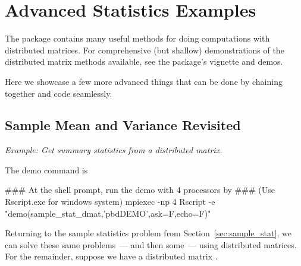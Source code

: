
\chapter{Advanced Statistics Examples}
\label{chpt:avdstat}

\vspace{0.5cm}


The  package contains many useful methods for doing computations
with distributed matrices. For comprehensive (but shallow) demonstrations of
the distributed matrix methods available, see the  package's
vignette and demos.

Here we showcase a few more advanced things that can be done by chaining
together  and  code seamlessly.





\section{Sample Mean and Variance Revisited}

\emph{Example:  Get summary statistics from a distributed matrix.}

The demo command is
\begin{Command}
### At the shell prompt, run the demo with 4 processors by
### (Use Rscript.exe for windows system)
mpiexec -np 4 Rscript -e "demo(sample_stat_dmat,'pbdDEMO',ask=F,echo=F)"
\end{Command}

Returning to the sample statistics problem from
Section~\ref{sec:sample_stat}, we can solve these same problems~--- and
then some~--- using distributed matrices. For the remainder, suppose we
have a distributed matrix .

